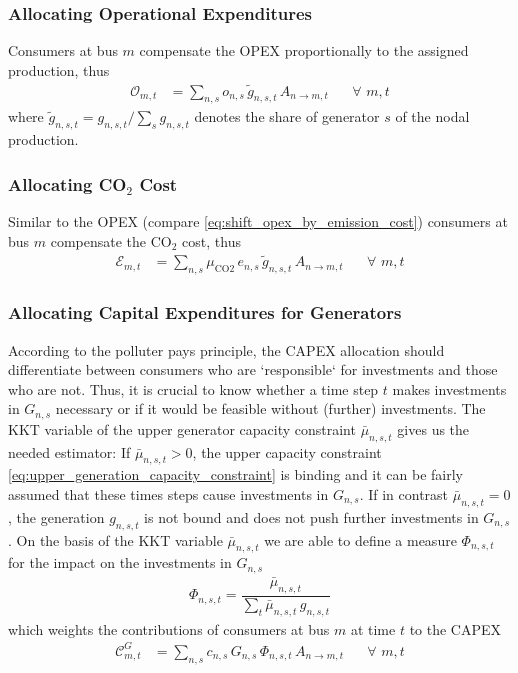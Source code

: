 \documentclass[11pt]{article}
\newcommand{\generation}{g_{n,s,t}}
\newcommand{\capacityGeneration}{G_{n,s}}
\newcommand{\capexGeneration}{c_{n,s}}
\newcommand{\opexGeneration}[1][n]{o_{#1,s}}
\newcommand{\muuppergeneration}[1][n]{\bar{\mu}_{#1,s,t}}
\newcommand{\allocatePeer}[1][n \rightarrow m]{A_{#1,t}}
\newcommand{\allocateCapexGeneration}{\mathcal{C}^{G}_{m,t}}
\newcommand{\allocateOpex}{\mathcal{O}_{m,t}}
\newcommand{\allocateEmissionCost}{\mathcal{E}_{m,t}}
\newcommand{\emission}{e_{n,s}}
\newcommand{\emissionPrice}{\mu_{\text{CO2}}}
\newcommand{\generatorshare}{\tilde{g}_{n,s,t}}
\newcommand{\impactcapexgeneration}{\Phi_{n,s,t}}
\newcommand{\Forall}[1]{\hspace{20pt} \forall \,\, #1 }
\begin{document}
\subsubsection*{Allocating Operational Expenditures}
Consumers at bus $m$ compensate the OPEX proportionally to the assigned production, thus 
\begin{align}
\allocateOpex &= \sum_{n,s} \opexGeneration \, \generatorshare \, \allocatePeer \Forall{m,t} \label{eq:allocate_opexGeneration}
\end{align}
where $\generatorshare = \generation/\sum_s \generation$ denotes the share of generator $s$ of the nodal production. \\

\subsubsection*{Allocating CO$_2$ Cost}
 Similar to the OPEX (compare \cref{eq:shift_opex_by_emission_cost}) consumers at bus $m$ compensate the CO$_2$ cost, thus 
\begin{align}
 \allocateEmissionCost &= \sum_{n,s} \emissionPrice \, \emission \, \generatorshare \, \allocatePeer \Forall{m,t} \label{eq:allocate_emissionPrice}
\end{align}


\subsubsection*{Allocating Capital Expenditures for Generators}
According to the polluter pays principle, the CAPEX allocation should differentiate between consumers who are `responsible` for investments and those who are not. Thus, it is crucial to know whether a time step $t$ makes investments in $\capacityGeneration$ necessary or if it would be feasible without (further) investments. The KKT variable of the upper generator capacity constraint $\muuppergeneration$ gives us the needed estimator: If $\muuppergeneration > 0$, the upper capacity constraint \cref{eq:upper_generation_capacity_constraint} is binding and it can be fairly assumed that these times steps cause investments in $\capacityGeneration$. If in contrast $\muuppergeneration = 0$, the generation $\generation$ is not bound and does not push further investments in $\capacityGeneration$.
On the basis of the KKT variable $\muuppergeneration$ we are able to define a measure $\impactcapexgeneration$ for the impact on the investments in $\capacityGeneration$  
\begin{align}
    \impactcapexgeneration = \dfrac{\muuppergeneration}{\sum_t \muuppergeneration \, \generation}
\end{align}
which weights the contributions of consumers at bus $m$ at time $t$ to the CAPEX 
\begin{align}
    \allocateCapexGeneration &= \sum_{n,s} \capexGeneration \, \capacityGeneration \, \impactcapexgeneration\, \allocatePeer \Forall{m,t} \label{eq:allocate_capexGeneration}
\end{align}
\end{document}
